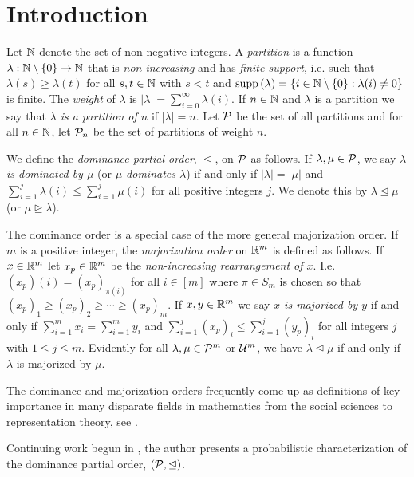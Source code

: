 \documentclass[12pt]{article}
\begin{document}
\section{Introduction}

Let $\mathbb{N}$ denote the set of non-negative integers. A \emph{partition} is a function $\lambda : \mathbb{N} \setminus \{0\} \to \mathbb{N}$ that is \emph{non-increasing} and has \emph{finite support}, i.e. such that $\lambda(s) \geq \lambda(t)$ for all $s,t \in \mathbb{N}$ with $s < t$ and $\text{supp}\,(\lambda) = \{i \in \mathbb{N} \setminus \{0\} : \lambda(i) \neq 0\}$ is finite. The \emph{weight} of $\lambda$ is $|\lambda| = \sum_{i=0}^\infty \lambda(i)$.  If $n \in \mathbb{N}$ and $\lambda$ is a partition we say that \emph{$\lambda$ is a partition of $n$} if $|\lambda| = n$.   Let ${\cal P}$ be the set of all partitions and for all $n \in \mathbb{N}$, let ${\cal P}_n$ be the set of partitions of weight $n$. 

We define the \emph{dominance partial order}, $\trianglelefteq$, on ${\cal P}$ as follows.  If $\lambda, \mu \in {\cal P}$, we say \emph{$\lambda$ is dominated by $\mu$} (or \emph{$\mu$ dominates $\lambda$}) if and only if $|\lambda| = |\mu|$ and $\sum_{i=1}^j \lambda(i) \leq \sum_{i=1}^j \mu(i)$ for all positive integers $j$.   We denote this by $\lambda \trianglelefteq \mu$ (or $\mu \trianglerighteq \lambda$).

The dominance order is a special case of the more general majorization order.  If $m$ is a positive integer, the \emph{majorization order} on $\mathbb{R}^m$ is defined as follows. If $x \in \mathbb{R}^m$ let $x_p \in \mathbb{R}^m$ be the \emph{non-increasing rearrangement of $x$}.  I.e. $(x_p)(i) = (x_p)_{\pi(i)}$ for all $i \in [m]$ where $\pi \in S_m$ is chosen so that $(x_p)_1 \geq (x_p)_2 \geq \cdots \geq (x_p)_m$. If $x,y \in \mathbb{R}^m$ we say \emph{$x$ is majorized by $y$} if and only if $\sum_{i=1}^m x_i = \sum_{i=1}^m y_i$ and $\sum_{i=1}^j (x_p)_i \leq \sum_{i=1}^j (y_p)_i$ for all integers $j$ with $1 \leq j \leq m$.  Evidently for all $\lambda, \mu \in {\cal P}^m$ or ${\cal U}^m$, we have $\lambda \trianglelefteq \mu$ if and only if $\lambda$ is majorized by $\mu$.

The dominance and majorization orders frequently come up as definitions of key importance in many disparate fields in mathematics from the social sciences to representation theory, see \cite{James:1981aa,Marshall:2011aa}.

Continuing work begun in \cite{Mahlburg:2013aa}, the author presents a probabilistic characterization of the dominance partial order, $({\cal P}, \trianglelefteq)$.
\end{document}
